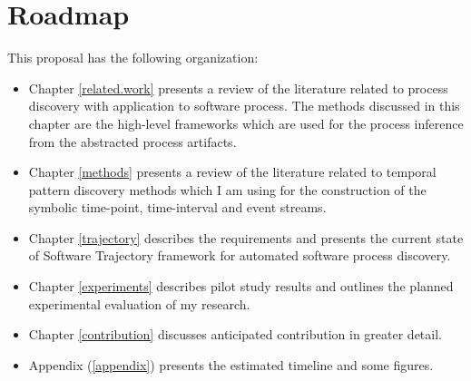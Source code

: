 \section{Roadmap}
This proposal has the following organization:
\begin{itemize}
	\item Chapter \ref{related.work} presents a review of the literature related to process discovery with application to software process. The methods discussed in this chapter are the high-level frameworks which are used for the process inference from the abstracted process artifacts.
	\item Chapter \ref{methods} presents a review of the literature related to temporal pattern discovery methods which I am using for the construction of the symbolic time-point, time-interval and event streams.
	\item Chapter \ref{trajectory} describes the requirements and presents the current state of Software Trajectory framework for automated software process discovery.
	\item Chapter \ref{experiments} describes pilot study results and outlines the planned experimental evaluation of my research.
	\item Chapter \ref{contribution} discusses anticipated contribution in greater detail.
	\item Appendix (\ref{appendix}) presents the estimated timeline and some figures.
\end{itemize}
